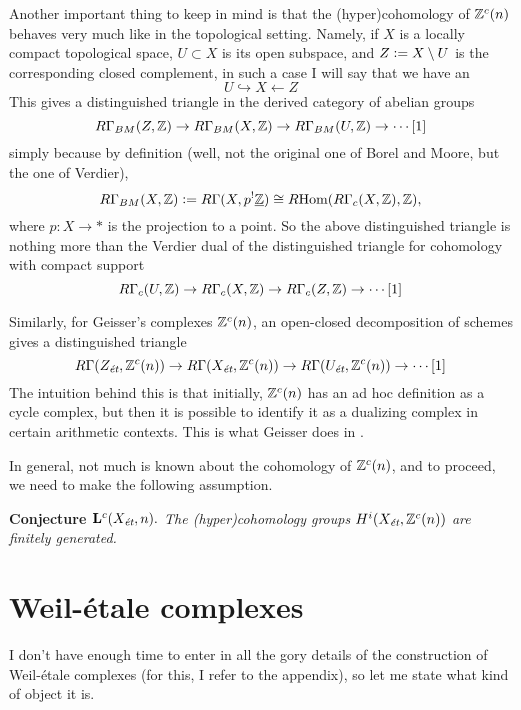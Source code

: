 \documentclass{article}
\theoremstyle{plain}
\begin{document}
Another important thing to keep in mind is that the (hyper)cohomology of
$\mathbb{Z}^c (n)$ behaves very much like  in the
topological setting. Namely, if $X$ is a locally compact topological space,
$U \subset X$ is its open subspace, and $Z \mathrel{\mathop:}= X\setminus U$ is the
corresponding closed complement, in such a case I will say that we have an
$$U \hookrightarrow X \leftarrow Z$$
This gives a distinguished triangle in the derived category of abelian groups
$$R\Gamma_{BM} (Z, \mathbb{Z}) \to R\Gamma_{BM} (X, \mathbb{Z}) \to R\Gamma_{BM} (U, \mathbb{Z}) \to \cdots [1]$$
simply because by definition (well, not the original one of Borel and Moore, but
the one of Verdier),
$$R\Gamma_{BM} (X,\mathbb{Z}) \mathrel{\mathop:}= R\Gamma (X, p^! \underline{\mathbb{Z}}) \cong R\!\operatorname{Hom} (R\Gamma_c (X,\mathbb{Z}), \mathbb{Z}),$$
where $p\colon X\to \ast$ is the projection to a point. So the above
distinguished triangle is nothing more than the Verdier dual of the
distinguished triangle for cohomology with compact support
$$R\Gamma_c (U,\mathbb{Z}) \to R\Gamma_c (X,\mathbb{Z}) \to R\Gamma_c (Z,\mathbb{Z}) \to \cdots [1]$$

Similarly, for Geisser's complexes $\mathbb{Z}^c (n)$, an open-closed decomposition of
schemes gives a distinguished triangle
\[
  R\Gamma (Z_\text{\it ét}, \mathbb{Z}^c (n)) \to
  R\Gamma (X_\text{\it ét}, \mathbb{Z}^c (n)) \to
  R\Gamma (U_\text{\it ét}, \mathbb{Z}^c (n)) \to \cdots [1]
\]
The intuition behind this is that initially, $\mathbb{Z}^c (n)$ has an ad hoc
definition as a cycle complex, but then it is possible to identify it as
a dualizing complex in certain arithmetic contexts. This is what Geisser does in
\cite{Geisser-10}.

In general, not much is known about the cohomology of $\mathbb{Z}^c (n)$, and to
proceed, we need to make the following assumption.

\vspace{1em}

\noindent\textbf{Conjecture $\mathbf{L}^c (X_\text{\it ét}, n).$}
\emph{The (hyper)cohomology groups $H^i (X_\text{\it ét}, \mathbb{Z}^c (n))$ are
  finitely generated.}


\section{Weil-étale complexes}

I don't have enough time to enter in all the gory details of the construction of
Weil-étale complexes (for this, I refer to the appendix), so let me state what
kind of object it is.
\end{document}
